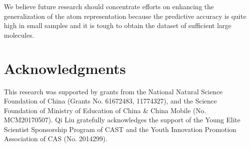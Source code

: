 \documentclass[letterpaper]{article} \usepackage{bm}
\begin{document}
We believe future research should concentrate efforts on enhancing the generalization of the atom representation because the predictive accuracy is quite high in small samples and it is tough to obtain the dataset of sufficient large molecules. 

\section{ Acknowledgments}
This research was supported by grants from the National Natural Science Foundation of China (Grants No. 61672483, 11774327), and the Science Foundation of Ministry of Education of China \& China Mobile (No. MCM20170507). Qi Liu gratefully acknowledges the support of the Young Elite Scientist Sponsorship Program of CAST and the Youth Innovation Promotion Association of CAS (No. 2014299).



\end{document}
